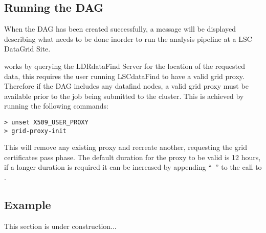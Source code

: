 \subsection{Running the DAG}

When the DAG has been created successfully, a message will be displayed
describing what needs to be done inorder to run the analysis pipeline at
a LSC DataGrid Site.

 works by querying the LDRdataFind Server for the
location of the requested data, this requires the user running
LSCdataFind to have a valid grid proxy. Therefore if the DAG includes
any datafind nodes, a valid grid proxy must be available prior to the
job being submitted to the cluster. This is achieved by running the
following commands:

\begin{verbatim}
> unset X509_USER_PROXY
> grid-proxy-init
\end{verbatim}

This will remove any existing proxy and recreate another, requesting the
grid certificates pass phase. The default duration for the proxy to be
valid is 12 hours, if a longer duration is required it can be increased
by appending ``~'' to the call to
.

\subsection{Example}

This section is under construction...
